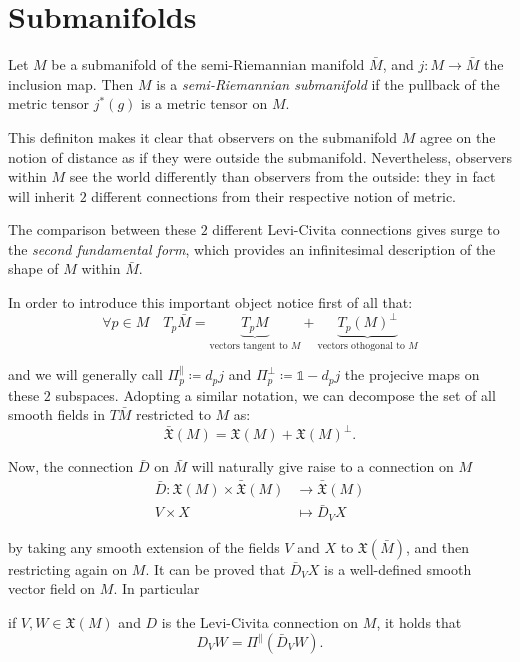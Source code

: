 \section{Submanifolds}
\label{sec:submanifolds}

\begin{definition}
	Let \(M\) be a submanifold of the semi-Riemannian manifold \(\bar{M}\), and \(j:M\rightarrow\bar{M}\) the inclusion map. Then \(M\) is a \emph{semi-Riemannian submanifold} if the pullback of the metric tensor \(j^*(g)\) is a metric tensor on \(M\).
\end{definition}

This definiton makes it clear that observers on the submanifold \(M\) agree on the notion of distance as if they were outside the submanifold. Nevertheless, observers within \(M\) see the world differently than observers from the outside: they in fact will inherit \(2\) different connections from their respective notion of metric. 

The comparison between these \(2\) different Levi-Civita connections gives surge to the \emph{second fundamental form}, which provides an infinitesimal description of the shape of \(M\) within \(\bar{M}\).

In order to introduce this important object notice first of all that:
\[
\forall p \in M \quad T_p\bar{M} = \underbrace{T_pM}_{\text{vectors tangent to }M}+ \underbrace{T_p(M)^{\perp}}_{\text{vectors othogonal to } M}
\]

\noindent and we will generally call \(\Pi_p^{\parallel}\coloneqq d_pj\) and \(\Pi_p^{\perp}\coloneqq \mathbb{1} - d_pj\) the projecive maps on these \(2\) subspaces.
Adopting a similar notation, we can decompose the set of all smooth fields in \(T\bar{M}\) restricted to \(M\) as:
\[
\bar{\mathfrak{X}}(M) = \mathfrak{X}(M) + \mathfrak{X}(M)^{\perp}.
\]

Now, the connection \(\bar{D}\) on \(\bar{M}\) will naturally give raise to a connection on \(M\)
\begin{align*}
\bar{D} : \mathfrak{X}(M) \times \bar{\mathfrak{X}}(M) & \rightarrow \bar{\mathfrak{X}}(M) \\
	 V \times X &\mapsto \bar{D}_V X
\end{align*}

by taking any smooth extension of the fields \(V\) and \(X\) to \(\mathfrak{X}(\bar{M})\), and then restricting again on \(M\). It can be proved that \(\bar{D}_V X\) is a well-defined smooth vector field on \(M\). In particular
\begin{lemma} 
	if \(V, W \in \mathfrak{X}(M)\) and \(D\) is the Levi-Civita connection on \(M\), it holds that
	\[
	D_V W = \Pi^{\parallel}\left(\bar{D}_V W\right).
	\]
\end{lemma}

